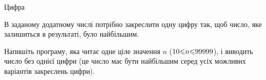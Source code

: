 \begin{problemAllDefault}{Цифра}

В заданому додатному числі потрібно закреслити одну цифру так, щоб число, яке залишиться в результаті, було найбільшим.

Напишіть програму, яка читає одне ціле значення $n$ ($10{\leqslant}n{\leqslant}99999$), і виводить число без однієї цифри (це число має бути найбільшим серед усіх можливих варіантів закреслень цифри).

\Examples
\begin{exampleSimple}{3em}{3em}%
%
%
\end{exampleSimple}

\end{problemAllDefault}

